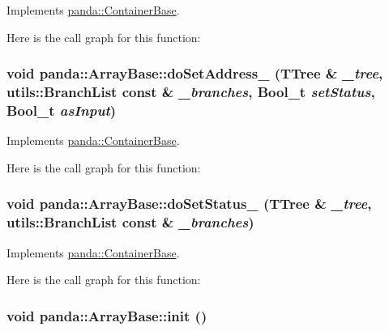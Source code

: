 Implements \hyperlink{classpanda_1_1ContainerBase_af5628a554142af0fcbbec3f28edd1666}{panda::ContainerBase}.

Here is the call graph for this function:\hypertarget{classpanda_1_1ArrayBase_a1ddaf0aff0dd758a0c4d99d0422db5b0}{
\subsubsection[{doSetAddress\_\-}]{\setlength{\rightskip}{0pt plus 5cm}void panda::ArrayBase::doSetAddress\_\- (TTree \& {\em \_\-tree}, \/  {\bf utils::BranchList} const \& {\em \_\-branches}, \/  Bool\_\-t {\em setStatus}, \/  Bool\_\-t {\em asInput})}}
\label{classpanda_1_1ArrayBase_a1ddaf0aff0dd758a0c4d99d0422db5b0}


Implements \hyperlink{classpanda_1_1ContainerBase_a1f8b467981e2d6e55cf1b1e355e4eb93}{panda::ContainerBase}.

Here is the call graph for this function:\hypertarget{classpanda_1_1ArrayBase_a7c39d39cffed07ba2cffdf8828729cf7}{
\subsubsection[{doSetStatus\_\-}]{\setlength{\rightskip}{0pt plus 5cm}void panda::ArrayBase::doSetStatus\_\- (TTree \& {\em \_\-tree}, \/  {\bf utils::BranchList} const \& {\em \_\-branches})}}
\label{classpanda_1_1ArrayBase_a7c39d39cffed07ba2cffdf8828729cf7}


Implements \hyperlink{classpanda_1_1ContainerBase_aaae758928771e25de7c62db2fc9de750}{panda::ContainerBase}.

Here is the call graph for this function:\hypertarget{classpanda_1_1ArrayBase_a4df67e49765f19d5cd8596108eca11ed}{
\subsubsection[{init}]{\setlength{\rightskip}{0pt plus 5cm}void panda::ArrayBase::init ()}}
\label{classpanda_1_1ArrayBase_a4df67e49765f19d5cd8596108eca11ed}


